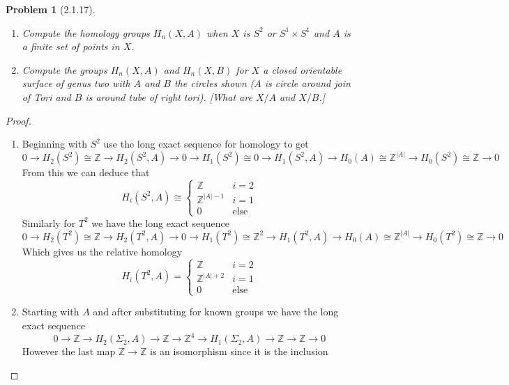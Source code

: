 \documentclass[10pt]{article}
\newcommand{\bb}[1]{\mathbb{#1}}
\theoremstyle{plain}
\newtheorem{problem}{Problem}
\theoremstyle{remark}
\begin{document}
\begin{problem}[2.1.17]
  \begin{enumerate}
  \item[(a)] Compute the homology groups $H_n(X,A)$ when $X$ is $S^2$ or
    $S^1\times S^1$ and $A$ is a finite set of points in $X$.
  \item[(b)] Compute the groups $H_n(X,A)$ and $H_n(X,B)$ for $X$ a
    closed orientable surface of genus two with $A$ and $B$ the circles
    shown ($A$ is circle around join of Tori and $B$ is around tube of right
    tori). [What are $X/A$ and $X/B$.]
  \end{enumerate}
\end{problem}

\begin{proof}
  \begin{enumerate}
  \item[(a)] Beginning with $S^2$ use the long exact sequence for homology
    to get
    \[
      0 \rightarrow H_2(S^2)\cong \bb{Z} \rightarrow H_2(S^2,A) \rightarrow 0 \rightarrow H_1(S^2)\cong 0 \rightarrow H_1(S^2,A) \rightarrow H_0(A)\cong\bb{Z}^{|A|} \rightarrow H_0(S^2)\cong\bb{Z} \rightarrow 0
    \]
    From this we can deduce that
    \[
      H_i(S^2,A)\cong \left\{
        \begin{array}{lr}
          \bb{Z}& i=2\\
          \bb{Z}^{|A|-1} & i=1\\
          0 & \text{else}
        \end{array}
      \right.
    \]
    Similarly for $T^2$ we have the long exact sequence
    \[
      0 \rightarrow H_2(T^2)\cong \bb{Z} \rightarrow H_2(T^2,A) \rightarrow 0 \rightarrow H_1(T^2)\cong \bb{Z}^2 \rightarrow H_1(T^2,A) \rightarrow H_0(A)\cong\bb{Z}^{|A|} \rightarrow H_0(T^2)\cong\bb{Z} \rightarrow 0
    \]
    Which gives us the relative homology
    \[
      H_i(T^2,A) = \left\{
        \begin{array}{lr}
          \bb{Z}&i=2\\
          \bb{Z}^{|A|+2}& i=1\\
          0 & \text{else}
        \end{array}
      \right.
    \]
  \item[(b)] Starting with $A$ and after substituting for known groups we have the long exact sequence
    \[
      0 \rightarrow \bb{Z} \rightarrow H_2(\Sigma_2,A)\rightarrow \bb{Z}\rightarrow\bb{Z}^4\rightarrow H_1(\Sigma_2,A)\rightarrow \bb{Z} \rightarrow \bb{Z} \rightarrow 0
    \]
    However the last map $\bb{Z}\rightarrow \bb{Z}$ is an isomorphism since it is the inclusion

\end{enumerate}
\end{proof}
\end{document}
